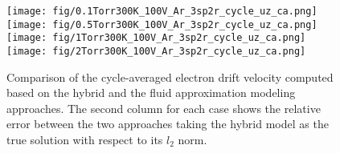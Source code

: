 
\begin{figure}[!tbhp]
	\centering
	
	\texttt{[image: fig/0.1Torr300K\_100V\_Ar\_3sp2r\_cycle\_uz\_ca.png]} 
	\texttt{[image: fig/0.5Torr300K\_100V\_Ar\_3sp2r\_cycle\_uz\_ca.png]}
	\texttt{[image: fig/1Torr300K\_100V\_Ar\_3sp2r\_cycle\_uz\_ca.png]}   
	\texttt{[image: fig/2Torr300K\_100V\_Ar\_3sp2r\_cycle\_uz\_ca.png]}   
	
	\caption{Comparison of the cycle-averaged electron drift velocity computed based on the hybrid and the fluid approximation modeling approaches. The second column for each case shows the relative error between the two approaches taking the hybrid model as the true solution with respect to its $l_2$ norm. \label{fig:drift_velocity_hybrid_fluid}}
\end{figure}

